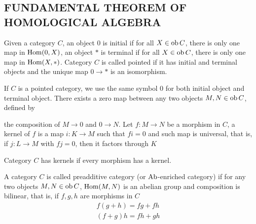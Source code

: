 \documentclass{article}
\begin{document}
\subsection{FUNDAMENTAL THEOREM OF HOMOLOGICAL ALGEBRA}

\begin{definition}
    Given a category $C$, an object $0$ is initial if for all $X \in \operatorname{ob} C$, there is only one map in $\operatorname{Hom}(0, X)$, an object $*$ is terminal if for all $X \in \operatorname{ob} C$, there is only one map in $\operatorname{Hom}(X, *)$. Category $C$ is called pointed if it has initial and terminal objects and the unique map $0 \to *$ is an isomorphism.
    
    If $C$ is a pointed category, we use the same symbol $0$ for both initial object and terminal object. There exists a zero map between any two objects $M, N \in \operatorname{ob} C$, defined by
    \begin{center}
    \end{center}
    the composition of $M \to 0$ and $0 \to N$. Let $f: M \to N$ be a morphism in $C$, a kernel of $f$ is a map $i: K \to M$ such that $f i = 0$ and such map is universal, that is, if $j: L \to M$ with $f j = 0$, then it factors through $K$
    \begin{center}
    \end{center}
    Category $C$ has kernels if every morphism has a kernel.
\end{definition}

\begin{definition}
    A category $C$ is called preadditive category (or $\operatorname{Ab}$-enriched category) if for any two objects $M, N \in \operatorname{ob} C$, $\operatorname{Hom}(M, N)$ is an abelian group and composition is bilinear, that is, if $f, g, h$ are morphisms in $C$
    \begin{align*}
        f (g + h) = fg + fh \\
        (f + g) h = fh + gh
    \end{align*}
\end{definition}
\end{document}
